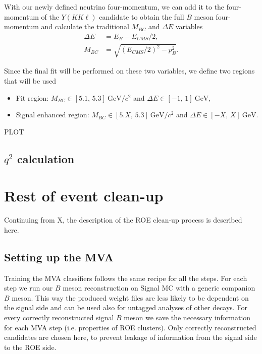 \documentclass[oneside,a4paper,openany,12pt]{scrbook}
\newcommand {\e}[1]{\mathrm{~#1}}
\begin{document}
With our newly defined neutrino four-momentum, we can add it to the four-momentum of the $Y(KK\ell)$ candidate to obtain the full $B$ meson four-momentum and calculate the traditional $M_{BC}$ and $\Delta E$ variables
\begin{align}
\Delta E &= E_B - E_{CMS}/2,\\
M_{BC} &= \sqrt{\left(E_{CMS}/2\right)^2 - p_B^2}.
\end{align}

Since the final fit will be performed on these two variables, we define two regions that will be used
\begin{itemize}
\item Fit region: $M_{BC} \in [5.1,\,5.3]\e{GeV}/c^2$ and $\Delta E \in [-1,\,1]\e{GeV}$,
\item Signal enhanced region: $M_{BC} \in [5.X,\,5.3]\e{GeV}/c^2$ and $\Delta E \in [-X,\,X]\e{GeV}$.
\end{itemize}

\begin{center}
PLOT
\end{center}

\section{$q^2$ calculation}

\chapter{Rest of event clean-up}

Continuing from X, the description of the ROE clean-up process is described here. 

\section{Setting up the MVA}

Training the MVA classifiers follows the same recipe for all the steps. For each step we run our $B$ meson reconstruction on Signal MC with a generic companion $B$ meson. This way the produced weight files are less likely to be dependent on the signal side and can be used also for untagged analyses of other decays. For every correctly reconstructed signal $B$ meson we save the necessary information for each MVA step (i.e. properties of ROE clusters). Only correctly reconstructed candidates are chosen here, to prevent leakage of information from the signal side to the ROE side.
\end{document}
